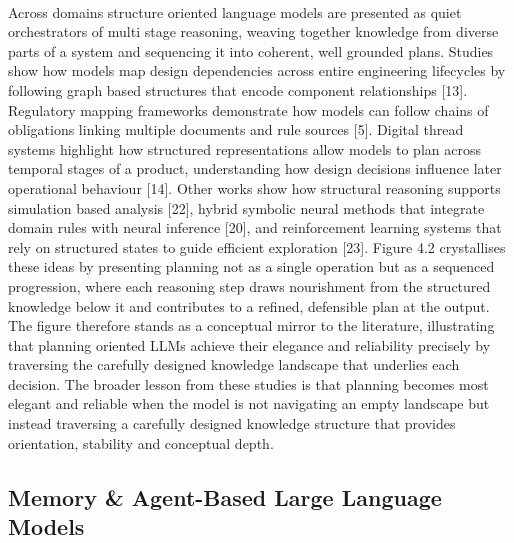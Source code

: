         \paragraph{}
        Across domains structure oriented language models are presented as quiet orchestrators of multi stage reasoning, weaving together knowledge from diverse parts of a system and sequencing it into coherent, well grounded plans. Studies show how models map design dependencies across entire engineering lifecycles by following graph based structures that encode component relationships [13]. Regulatory mapping frameworks demonstrate how models can follow chains of obligations linking multiple documents and rule sources [5]. Digital thread systems highlight how structured representations allow models to plan across temporal stages of a product, understanding how design decisions influence later operational behaviour [14]. Other works show how structural reasoning supports simulation based analysis [22], hybrid symbolic neural methods that integrate domain rules with neural inference [20], and reinforcement learning systems that rely on structured states to guide efficient exploration [23]. Figure 4.2 crystallises these ideas by presenting planning not as a single operation but as a sequenced progression, where each reasoning step draws nourishment from the structured knowledge below it and contributes to a refined, defensible plan at the output. The figure therefore stands as a conceptual mirror to the literature, illustrating that planning oriented LLMs achieve their elegance and reliability precisely by traversing the carefully designed knowledge landscape that underlies each decision. The broader lesson from these studies is that planning becomes most elegant and reliable when the model is not navigating an empty landscape but instead traversing a carefully designed knowledge structure that provides orientation, stability and conceptual depth.

    \subsection{Memory \& Agent-Based Large Language Models}

